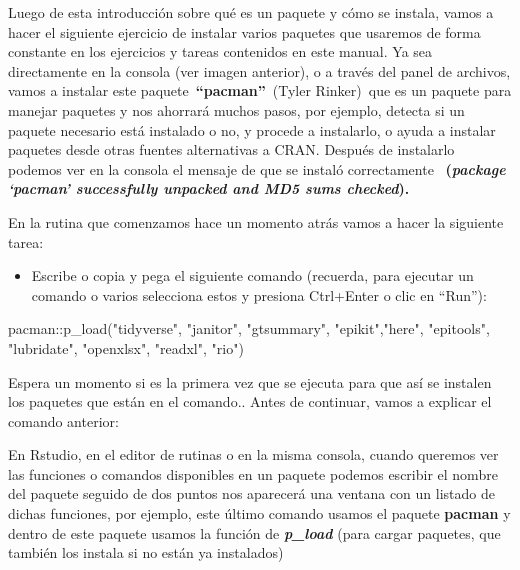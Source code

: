 \documentclass[
  letterpaper,
  DIV=11,
  numbers=noendperiod]{scrreprt}
\newenvironment{Shaded}{\begin{snugshade}}{\end{snugshade}}
\newcommand{\FunctionTok}[1]{\textcolor[rgb]{0.28,0.35,0.67}{#1}}
\newcommand{\NormalTok}[1]{\textcolor[rgb]{0.00,0.23,0.31}{#1}}
\newcommand{\SpecialCharTok}[1]{\textcolor[rgb]{0.37,0.37,0.37}{#1}}
\newcommand{\StringTok}[1]{\textcolor[rgb]{0.13,0.47,0.30}{#1}}
\providecommand{\tightlist}{%
  \setlength{\itemsep}{0pt}\setlength{\parskip}{0pt}}\usepackage{longtable,booktabs,array}
\begin{document}
Luego de esta introducción sobre qué es un paquete y cómo se instala,
vamos a hacer el siguiente ejercicio de instalar varios paquetes que
usaremos de forma constante en los ejercicios y tareas contenidos en
este manual. Ya sea directamente en la consola (ver imagen anterior), o
a través del panel de archivos, vamos a instalar este
paquete~\textbf{``pacman''}~(Tyler Rinker)~que es un paquete para
manejar paquetes y nos ahorrará muchos pasos, por ejemplo, detecta si un
paquete necesario está instalado o no, y procede a instalarlo, o ayuda a
instalar paquetes desde otras fuentes alternativas a CRAN. Después de
instalarlo podemos ver en la consola el mensaje de que se instaló
correctamente~ \textbf{(\emph{package `pacman' successfully unpacked and
MD5 sums checked}).}

En la rutina que comenzamos hace un momento atrás vamos a hacer la
siguiente tarea:

\begin{itemize}
\tightlist
\item
  Escribe o copia y pega el siguiente comando (recuerda, para ejecutar
  un comando o varios selecciona estos y presiona Ctrl+Enter o clic en
  ``Run''):
\end{itemize}

\begin{Shaded}
\begin{Highlighting}[]
\NormalTok{pacman}\SpecialCharTok{::}\FunctionTok{p\_load}\NormalTok{(}\StringTok{"tidyverse"}\NormalTok{, }\StringTok{"janitor"}\NormalTok{, }\StringTok{"gtsummary"}\NormalTok{, }\StringTok{"epikit"}\NormalTok{,}\StringTok{"here"}\NormalTok{,                }\StringTok{"epitools"}\NormalTok{, }\StringTok{"lubridate"}\NormalTok{, }\StringTok{"openxlsx"}\NormalTok{, }\StringTok{"readxl"}\NormalTok{, }\StringTok{"rio"}\NormalTok{)}
\end{Highlighting}
\end{Shaded}

Espera un momento si es la primera vez que se ejecuta para que así se
instalen los paquetes que están en el comando.. Antes de continuar,
vamos a explicar el comando anterior:

En Rstudio, en el editor de rutinas o en la misma consola, cuando
queremos ver las funciones o comandos disponibles en un paquete podemos
escribir el nombre del paquete seguido de dos puntos nos aparecerá una
ventana con un listado de dichas funciones, por ejemplo, este último
comando usamos el paquete \textbf{pacman} y dentro de este paquete
usamos la función de \textbf{\emph{p\_load}} (para cargar paquetes, que
también los instala si no están ya instalados)
\end{document}
